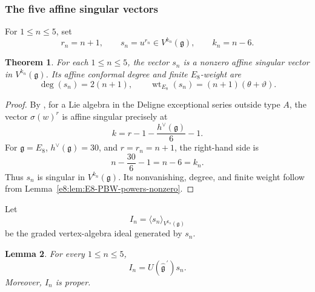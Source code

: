 \documentclass[11pt,reqno]{amsart}
\newtheorem{theorem}{Theorem}[section]
\newtheorem{lemma}[theorem]{Lemma}
\theoremstyle{definition}
\theoremstyle{remark}
\providecommand{\g}{\mathfrak{g}}
\providecommand{\wt}{\operatorname{wt}}
\begin{document}
\subsubsection{The five affine singular vectors}


For $1\le n\le5$, set
\begin{equation*}
  r_n=n+1,
  \qquad
  s_n=u^{r_n}\in V^{k_n}(\g),
  \qquad
  k_n=n-6.
\end{equation*}

\begin{theorem}

For each $1\le n\le5$, the vector $s_n$ is a nonzero affine singular vector
in $V^{k_n}(\g)$.  Its affine conformal degree and finite $E_8$-weight are
\begin{equation*}
  \deg(s_n)=2(n+1),
  \qquad
  \wt_{E_8}(s_n)=(n+1)(\theta+\vartheta).
\end{equation*}
\end{theorem}

\begin{proof}
By \cite[Theorem~4.2(1)(b)]{ArakawaMoreau2018}, for a Lie algebra in the
Deligne exceptional series outside type $A$, the vector
$\sigma(w)^{r}$ is affine singular precisely at
\begin{equation*}
  k=r-1-\frac{h^{\vee}(\g)}{6}-1.
\end{equation*}
For $\g=E_8$, $h^{\vee}(\g)=30$, and $r=r_n=n+1$, the right-hand side is
\begin{equation*}
  n-\frac{30}{6}-1=n-6=k_n.
\end{equation*}
Thus $s_n$ is singular in $V^{k_n}(\g)$.  Its nonvanishing, degree, and
finite weight follow from Lemma~\ref{e8:lem:E8-PBW-powers-nonzero}.
\end{proof}

Let
\begin{equation*}
  I_n=\langle s_n\rangle_{V^{k_n}(\g)}
\end{equation*}
be the graded vertex-algebra ideal generated by $s_n$.

\begin{lemma}

For every $1\le n\le5$,
\begin{equation}
  I_n
  =U(\widehat{\g}^{\,\prime})s_n.
  \label{e8:eq:E8-In-equals-affine-submodule}
\end{equation}
Moreover, $I_n$ is proper.
\end{lemma}
\end{document}
